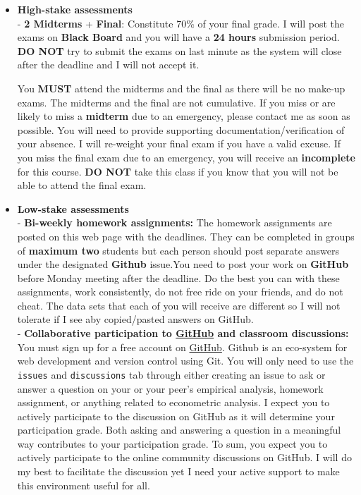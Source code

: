 \documentclass[
]{book}
\begin{document}
\begin{itemize}
\item
  \textbf{High-stake assessments}\\
  - \textbf{2 Midterms} + \textbf{Final}: Constitute 70\% of your final grade. I will post the exams on \textbf{Black Board} and you will have a \textbf{24 hours} submission period. \textbf{DO NOT} try to submit the exams on last minute as the system will close after the deadline and I will not accept it.

  You \textbf{MUST} attend the midterms and the final as there will be no make-up exams. The midterms and the final are not cumulative. If you miss or are likely to miss a \textbf{midterm} due to an emergency, please contact me as soon as possible. You will need to provide supporting documentation/verification of your absence. I will re-weight your final exam if you have a valid excuse. If you miss the final exam due to an emergency, you will receive an \textbf{incomplete} for this course. \textbf{DO NOT} take this class if you know that you will not be able to attend the final exam.
\item
  \textbf{Low-stake assessments}\\
  - \textbf{Bi-weekly homework assignments:} The homework assignments are posted on this web page with the deadlines. They can be completed in groups of \textbf{maximum two} students but each person should post separate answers under the designated \textbf{Github} issue.You need to post your work on \textbf{GitHub} before Monday meeting after the deadline. Do the best you can with these assignments, work consistently, do not free ride on your friends, and do not cheat. The data sets that each of you will receive are different so I will not tolerate if I see aby copied/pasted answers on GitHub.\\
  - \textbf{Collaborative participation to \href{https://github.com/}{GitHub} and classroom discussions:} You must sign up for a free account on \href{https://github.com/}{GitHub}. Github is an eco-system for web development and version control using Git. You will only need to use the \texttt{issues} and \texttt{discussions} tab through either creating an issue to ask or answer a question on your or your peer's empirical analysis, homework assignment, or anything related to econometric analysis. I expect you to actively participate to the discussion on GitHub as it will determine your participation grade. Both asking and answering a question in a meaningful way contributes to your participation grade. To sum, you expect you to actively participate to the online community discussions on GitHub. I will do my best to facilitate the discussion yet I need your active support to make this environment useful for all.
\end{itemize}
\end{document}
